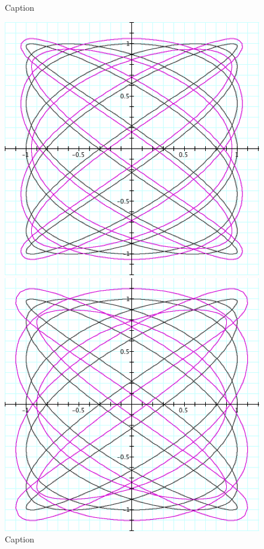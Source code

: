 \begin{figure}[H]
\begin{minipage}[b]{0.4\linewidth}
    \caption{Caption} 
    \label{fig:fig31}
    \vspace{4ex}
  \end{minipage} %
  \begin{minipage}[b]{0.4\linewidth}
    \centering
    \includegraphics[width=.9\linewidth]{parametric-polar-img/Fig 32.png} 
    \caption{Caption} 
    \label{fig:fig32}
    \vspace{4ex}
  \end{minipage} %
  \begin{minipage}[b]{0.4\linewidth}
    \centering
    \includegraphics[width=.9\linewidth]{parametric-polar-img/Fig 33.png} 

\end{minipage}
\end{figure}
